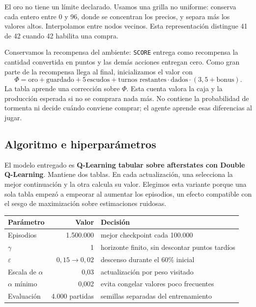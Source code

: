 \documentclass[10pt,a4paper]{article}
\begin{document}
El oro no tiene un límite declarado. Usamos una grilla no uniforme: conserva cada entero entre 0 y 96, donde se concentran los precios, y separa más los valores altos. Interpolamos entre nodos vecinos. Esta representación distingue 41 de 42 cuando 42 habilita una compra.

Conservamos la recompensa del ambiente: \texttt{SCORE} entrega como recompensa la cantidad convertida en puntos y las demás acciones entregan cero. Como gran parte de la recompensa llega al final, inicializamos el valor con
\[
\Phi=\text{oro}+\text{guardado}+5\,\text{escudos}
+\text{turnos restantes}\cdot\text{dados}\cdot(3{,}5+\text{bonus}).
\]
La tabla aprende una corrección sobre $\Phi$. Esta cuenta valora la caja y la producción esperada si no se comprara nada más. No contiene la probabilidad de tormenta ni decide cuándo conviene comprar; el agente aprende esas diferencias al jugar.

\subsection{Algoritmo e hiperparámetros}

El modelo entregado es \textbf{Q-Learning tabular sobre afterstates con Double Q-Learning}. Mantiene dos tablas. En cada actualización, una selecciona la mejor continuación y la otra calcula su valor. Elegimos esta variante porque una sola tabla empezó a empeorar al aumentar los episodios, un efecto compatible con el sesgo de maximización sobre estimaciones ruidosas.

\begin{center}
\small
\begin{tabular}{@{}lrp{8.2cm}@{}}
\toprule
Parámetro & Valor & Decisión \\
\midrule
Episodios & 1.500.000 & mejor checkpoint cada 100.000 \\
$\gamma$ & 1 & horizonte finito, sin descontar puntos tardíos \\
$\varepsilon$ & $0{,}15\rightarrow0{,}02$ & descenso durante el 60\% inicial \\
Escala de $\alpha$ & 0,03 & actualización por peso visitado \\
$\alpha$ mínimo & 0,002 & evita congelar valores poco frecuentes \\
Evaluación & 4.000 partidas & semillas separadas del entrenamiento \\
\bottomrule
\end{tabular}
\end{center}
\end{document}
